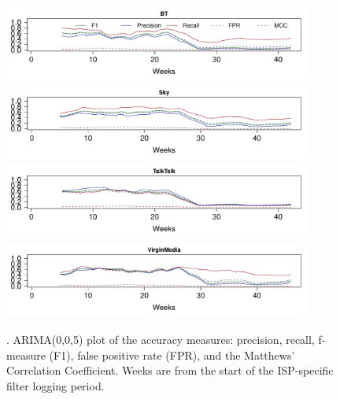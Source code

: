 \documentclass{bmcart}
\begin{document}
\begin{figure}[h!]
\caption{. ARIMA(0,0,5) plot of the accuracy measures: precision, recall, f-measure (F1), false positive rate (FPR), and the Matthews' Correlation Coefficient. Weeks are from the start of the ISP-specific filter logging period.}
\includegraphics[width=0.9\textwidth]{imgs/BT-ts-accuracy}
\includegraphics[width=0.9\textwidth]{imgs/Sky-ts-accuracy}
\includegraphics[width=0.9\textwidth]{imgs/TalkTalk-ts-accuracy}
\includegraphics[width=0.9\textwidth]{imgs/VirginMedia-ts-accuracy}
\label{fig:broadband-accuracy-ts}
\end{figure}
\end{document}

